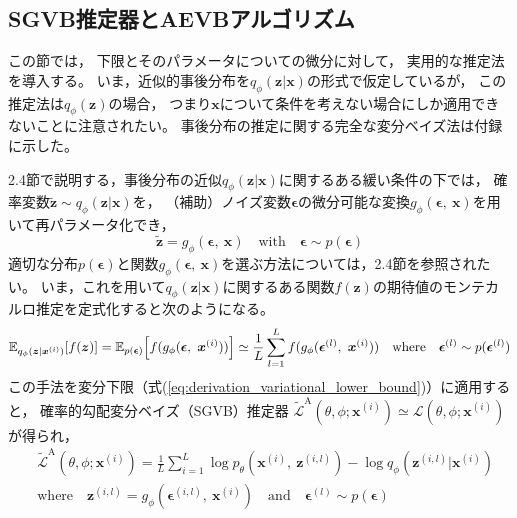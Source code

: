 \documentclass[dvipdfmx, fleqn]{jsarticle}
\begin{document}
\subsection{SGVB推定器とAEVBアルゴリズム}

この節では，
下限とそのパラメータについての微分に対して，
実用的な推定法を導入する。
いま，近似的事後分布を\(q_{\phi} (\bm{z} | \bm{x})\)の形式で仮定しているが，
この推定法は\(q_{\phi} (\bm{z})\)の場合，
つまり\(\bm{x}\)について条件を考えない場合にしか適用できないことに注意されたい。
事後分布の推定に関する完全な変分ベイズ法は付録に示した。

2.4節で説明する，事後分布の近似\(q_{\phi} (\bm{z} | \bm{x})\)に関するある緩い条件の下では，
確率変数\(\tilde{\bm{z}} \sim q_{\phi} (\bm{z} | \bm{x})\)を，
（補助）ノイズ変数\(\bm{\epsilon}\)の微分可能な変換\(g_{\phi} (\bm{\epsilon},\ \bm{x})\)を用いて再パラメータ化でき，
\begin{equation}
    \tilde{\bm{z}} = g_{\phi} (\bm{\epsilon},\ \bm{x})
        \quad \text{with} \quad
        \bm{\epsilon} \sim p(\bm{\epsilon})
    \label{eq:reparameterization}
\end{equation}
適切な分布\(p(\bm{\epsilon})\)と関数\(g_{\phi} (\bm{\epsilon},\ \bm{x})\)を選ぶ方法については，2.4節を参照されたい。
いま，これを用いて\(q_{\phi} (\bm{z} | \bm{x})\)に関するある関数\(f(\bm{z})\)の期待値のモンテカルロ推定を定式化すると次のようになる。
\begin{equation}
    \mathbb{E}_{q_{\phi} (\bm{z} | \bm{x}^{(i)})} \qty[f(\bm{z})]
        = \mathbb{E}_{p(\bm{\epsilon})} \qty[f(g_{\phi} (\bm{\epsilon},\ \bm{x}^{(i)}))]
        \simeq \frac{1}{L} \sum_{l=1}^{L} f(g_{\phi} (\bm{\epsilon}^{(l)},\ \bm{x}^{(i)}))
    \quad \text{where} \quad
    \bm{\epsilon}^{(l)} \sim p(\bm{\epsilon}^{(l)})
    \label{eq:expectation}
\end{equation}
この手法を変分下限（式(\ref{eq:derivation_variational_lower_bound})）に適用すると，
確率的勾配変分ベイズ（SGVB）推定器
\(\tilde{\mathcal{L}}^\mathrm{A} (\theta, \phi; \bm{x}^{(i)}) \simeq \mathcal{L} (\theta, \phi; \bm{x}^{(i)})\)が得られ，
\begin{equation}
    \begin{split}
    & \tilde{\mathcal{L}}^\mathrm{A} (\theta, \phi; \bm{x}^{(i)})
        = \frac{1}{L} \sum_{i=1}^{L} \log{p_{\theta} (\bm{x}^{(i)},\ \bm{z}^{(i, l)})} - \log{q_{\phi} (\bm{z}^{(i, l)} | \bm{x}^{(i)})} \\
    & \text{where} \quad
        \bm{z}^{(i, l)} = g_{\phi} (\bm{\epsilon}^{(i, l)},\ \bm{x}^{(i)})
        \quad \text{and} \quad
        \bm{\epsilon}^{(l)} \sim p(\bm{\epsilon})
    \end{split}
    \label{eq:SGVB_estimator_A}
\end{equation}
\end{document}
